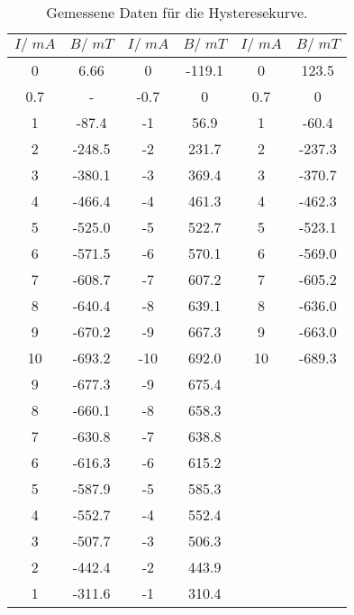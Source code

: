 \begin{table}[H]
  \centering
   \begin{tabular}{c c| c c| c c}
    \toprule
    $I /\;\si{mA}$ & $ B/\;\si{mT}$ & $I /\;\si{mA}$ & $ B/\;\si{mT}$ &
    $I /\;\si{mA}$ & $ B/\;\si{mT}$\\
    \midrule
    0 & 6.66 & 0 & -119.1 & 0 & 123.5 \\
    0.7 & - & -0.7 & 0 &  0.7 & 0 \\
    1 & -87.4 & -1 & 56.9 & 1 & -60.4 \\
    2 & -248.5 & -2 & 231.7 & 2 & -237.3 \\
    3 & -380.1 & -3 & 369.4 & 3 & -370.7 \\
    4 & -466.4 & -4 & 461.3 & 4 & -462.3 \\
    5 & -525.0 & -5 & 522.7 & 5 & -523.1 \\
    6 & -571.5 & -6 & 570.1 & 6 & -569.0 \\
    7 & -608.7 & -7 & 607.2 & 7 & -605.2 \\
    8 & -640.4 & -8 & 639.1 & 8 & -636.0 \\
    9 & -670.2 & -9 & 667.3 & 9 & -663.0 \\
    10 & -693.2 & -10 & 692.0 & 10 & -689.3 \\
    9 & -677.3 &  -9 & 675.4 &  & \\
    8 & -660.1 & -8 & 658.3 &  &  \\
    7 & -630.8 &  -7 & 638.8 & &  \\
    6 & -616.3 & -6 & 615.2 &  &  \\
    5 & -587.9 & -5 & 585.3 &  &  \\
    4 & -552.7 & -4 & 552.4 &  &  \\
    3 & -507.7 & -3 & 506.3 &  &  \\
    2 & -442.4 & -2 & 443.9 &  &  \\
    1 & -311.6 & -1 & 310.4 &  &  \\
    \bottomrule
  \end{tabular}
  \caption{Gemessene Daten für die Hysteresekurve.}
  \label{tab:tabelle1}
\end{table}
